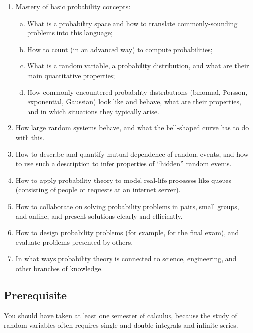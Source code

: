 \documentclass[oneside,11pt]{amsart}
\begin{document}
\begin{enumerate}[\bf{}1.]
	\item Mastery of basic probability concepts:
	\begin{enumerate}[(a)]
		\item What is a probability space and how to translate commonly-sounding problems into this language;
		\item How to count (in an advanced way) to compute probabilities;
		\item What is a random variable, a probability distribution,
		and what are their main quantitative properties;
		\item 
		How commonly encountered probability 
		distributions (binomial, Poisson, exponential, Gaussian) look like and behave,
		what are 
		their properties, and in which situations they typically arise.
	\end{enumerate}

	\item How large random systems behave, and what the 
	bell-shaped curve
	has to do with this.
	\item How to describe and quantify mutual dependence of random events,
	and how to use such a description 
	to infer properties of ``hidden'' random events.
	\item How to apply probability theory to model real-life processes like queues
	(consisting of people or requests at an internet server).
	\item How to collaborate on solving probability problems in pairs, small groups, and online,
	and present solutions clearly and efficiently.
	\item How to design probability problems (for example, for the 
	final exam), and evaluate problems presented by others.
	\item In what ways probability theory is connected to science,
	engineering, and other branches of knowledge.
\end{enumerate}

\subsection*{Prerequisite} You should have taken at least one semester of calculus, because
the study of random variables often requires single and double integrals
and infinite series.
\end{document}
